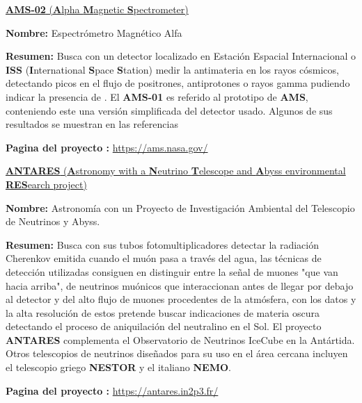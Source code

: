 \begin{itemize_f}

\item[-] \href{https://en.wikipedia.org/wiki/Alpha_Magnetic_Spectrometer}{\textbf{AMS-02} (\textbf{A}lpha \textbf{M}agnetic \textbf{S}pectrometer)}
\begin{itemize_f}\label{AMS}
\item \textbf{Nombre:} Espectrómetro Magnético Alfa
\item \textbf{Resumen:} Busca con un detector localizado en Estación Espacial Internacional o \textbf{ISS} (\textbf{I}nternational \textbf{S}pace \textbf{S}tation) medir la antimateria en los rayos cósmicos, detectando picos en el flujo de positrones, antiprotones o rayos gamma pudiendo indicar la presencia de \neutralinos. El \textbf{AMS-01} es referido al prototipo de \textbf{AMS}, conteniendo este una versión simplificada del detector usado. Algunos de sus resultados se muestran en las referencias \cite{li_antiproton_2017,battiston_anti_2008}
\item \textbf{Pagina del proyecto :} \url{https://ams.nasa.gov/}
\end{itemize_f}

\item[-] \href{https://en.wikipedia.org/wiki/ANTARES_(telescope)}{\textbf{ANTARES} (\textbf{A}stronomy with a \textbf{N}eutrino \textbf{T}elescope and \textbf{A}byss environmental \textbf{RES}earch project)}
\begin{itemize_f}\label{antares}
\item \textbf{Nombre:} Astronomía con un Proyecto de Investigación Ambiental del Telescopio de Neutrinos y Abyss.
\item \textbf{Resumen:} Busca con sus tubos fotomultiplicadores detectar la radiación Cherenkov emitida cuando el muón pasa a través del agua, las técnicas de detección utilizadas consiguen en distinguir entre la señal de muones "que van hacia arriba", de neutrinos muónicos que interaccionan antes de llegar por debajo al detector y del alto flujo de muones procedentes de la atmósfera, con los datos y la alta resolución de estos pretende buscar indicaciones de materia oscura detectando el proceso de aniquilación del neutralino en el Sol. El proyecto \textbf{ANTARES} complementa el Observatorio de Neutrinos IceCube en la Antártida. Otros telescopios de neutrinos diseñados para su uso en el área cercana incluyen el telescopio griego \textbf{NESTOR} y el italiano \textbf{NEMO}. 

\item \textbf{Pagina del proyecto :} \url{https://antares.in2p3.fr/}


\end{itemize_f}
\end{itemize_f}
